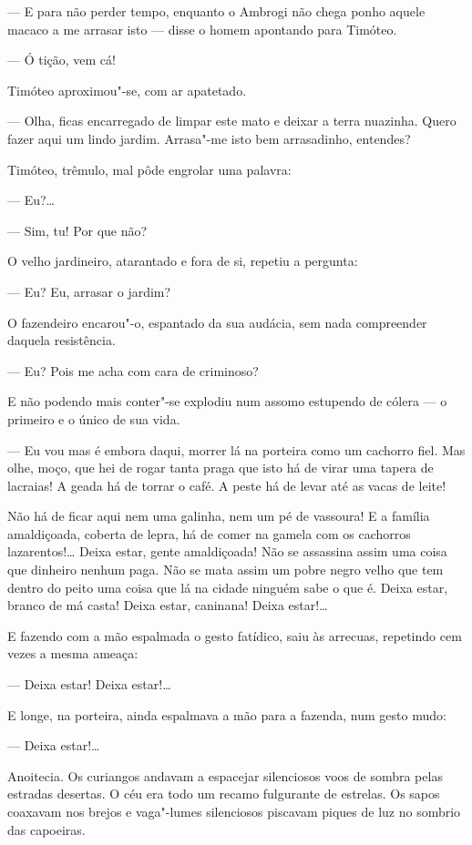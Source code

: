 --- E para não perder tempo, enquanto o Ambrogi não chega ponho aquele
macaco a me arrasar isto --- disse o homem apontando para Timóteo.

--- Ó tição, vem cá!

Timóteo aproximou"-se, com ar apatetado.

--- Olha, ficas encarregado de limpar este mato e deixar a terra
nuazinha. Quero fazer aqui um lindo jardim. Arrasa"-me isto bem
arrasadinho, entendes?

Timóteo, trêmulo, mal pôde engrolar uma palavra:

--- Eu?\ldots{}

--- Sim, tu! Por que não?

O velho jardineiro, atarantado e fora de si, repetiu a pergunta:

--- Eu? Eu, arrasar o jardim?

O fazendeiro encarou"-o, espantado da sua audácia, sem nada compreender
daquela resistência.

--- Eu? Pois me acha com cara de criminoso?

E não podendo mais conter"-se explodiu num assomo estupendo de cólera ---
o primeiro e o único de sua vida.

--- Eu vou mas é embora daqui, morrer lá na porteira como um cachorro
fiel. Mas olhe, moço, que hei de rogar tanta praga que isto há de virar
uma tapera de lacraias! A geada há de torrar o café. A peste há de levar
até as vacas de leite!

Não há de ficar aqui nem uma galinha, nem um pé de vassoura! E a família
amaldiçoada, coberta de lepra, há de comer na gamela com os cachorros
lazarentos!\ldots{} Deixa estar, gente amaldiçoada! Não se assassina assim
uma coisa que dinheiro nenhum paga. Não se mata assim um pobre negro
velho que tem dentro do peito uma coisa que lá na cidade ninguém sabe o
que é. Deixa estar, branco de má casta! Deixa estar, caninana! Deixa
estar!\ldots{}

E fazendo com a mão espalmada o gesto fatídico, saiu às arrecuas,
repetindo cem vezes a mesma ameaça:

--- Deixa estar! Deixa estar!\ldots{}

E longe, na porteira, ainda espalmava a mão para a fazenda, num gesto
mudo:

--- Deixa estar!\ldots{}

Anoitecia. Os curiangos andavam a espacejar silenciosos voos de sombra
pelas estradas desertas. O céu era todo um recamo fulgurante de
estrelas. Os sapos coaxavam nos brejos e vaga"-lumes silenciosos piscavam
piques de luz no sombrio das capoeiras.

